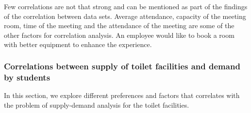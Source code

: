 Few correlations are not that strong and can be mentioned as part of the findings of the correlation between data sets. Average attendance, capacity of the meeting room, time of the meeting and the attendance of the meeting are some of the other factors for correlation analysis. An employee would like to book a room with better equipment to enhance the experience.

\subsubsection{Correlations between supply of toilet facilities and demand by students}

In this section, we explore different preferences and factors that correlates with the problem of supply-demand analysis for the toilet facilities.

